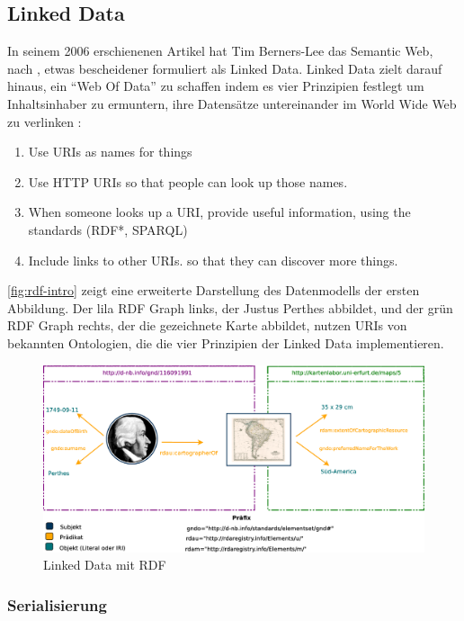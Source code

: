 \documentclass[float=false, crop=false]{standalone}
\begin{document}
\subsection{Linked Data}
\label{sec:linked-data}

In seinem 2006 erschienenen Artikel hat Tim Berners-Lee das Semantic Web, nach \citeauthor{dewilde2015information}, etwas bescheidener formuliert als Linked Data. Linked Data zielt darauf hinaus, ein \hyphenquote{german}{Web Of Data} zu schaffen indem es vier Prinzipien festlegt um Inhaltsinhaber zu ermuntern, ihre Datensätze untereinander im World Wide Web zu verlinken \autocite{berners2006linked}: 

\begin{enumerate}
	\item Use URIs as names for things
	\item Use HTTP URIs so that people can look up those names.
	\item When someone looks up a URI, provide useful information, using the standards (RDF*, SPARQL)
	\item Include links to other URIs. so that they can discover more things.
\end{enumerate}

\autoref{fig:rdf-intro} zeigt eine erweiterte Darstellung des Datenmodells der ersten Abbildung. Der lila RDF Graph links, der Justus Perthes abbildet, und der grün RDF Graph rechts, der die gezeichnete Karte abbildet, nutzen URIs von bekannten Ontologien, die die vier Prinzipien der Linked Data implementieren.

\begin{figure}[h]
	\centering
	\includegraphics[width=1\linewidth]{images/rdf-intro}
	\caption[Linked Data mit RDF]{Linked Data mit RDF}
	\label{fig:rdf-intro}
\end{figure}

\subsubsection{Serialisierung}
\label{sec:serialisierung}
\end{document}
